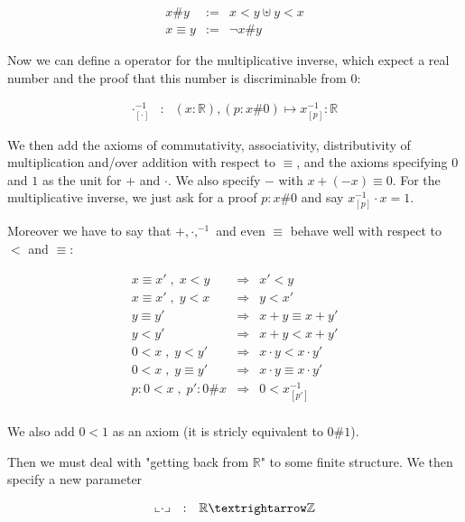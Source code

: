 \documentclass[a4paper,10pt]{article}
\newcommand{\R}{\mathbb{R}}
\newcommand{\Z}{\mathbb{Z}}
\begin{document}
  \[
  \begin{array}{ccl}
  x \# y     & := & x < y \uplus y < x \\
  x \equiv y & := & ¬ x \# y 
  \end{array}
  \]
  
  Now we can define a operator for the multiplicative inverse, which expect a real number and the proof that this number is discriminable from 0:
  
  \[
  \begin{array}{ccl}
  \cdot^{-1}_{[\cdot]} & : & (x:\R), (p:x\#0) \mapsto x^{-1}_{[p]} : \R
  \end{array}
  \]
  
  We then add the axioms of commutativity, associativity, distributivity of multiplication and/over addition with respect to $\equiv$, and the axioms specifying $0$ and $1$ as the unit for $+$ and $\cdot$. We also specify $-$ with $x+(-x)\equiv 0$. For the multiplicative inverse, we just ask for a proof $p:x\#0$ and say $x^{-1}_{[p]}\cdot x=1$.
  
  Moreover we have to say that $+,\cdot,^{-1}$ and even $\equiv$ behave well with respect to $<$ and $\equiv$:
  
  \[
  \begin{array}{rcl}
  x \equiv x' \;,\; x < y   &  \Rightarrow  & x' < y \\
  x \equiv x' \;,\; y < x   &  \Rightarrow  & y < x' \\
  y \equiv y'               &  \Rightarrow  & x + y \equiv x + y' \\
  y < y'                    &  \Rightarrow  & x + y < x + y' \\
  0 < x \;,\; y < y'        &  \Rightarrow  & x \cdot y < x \cdot y' \\
  0 < x \;,\; y \equiv y'   &  \Rightarrow  & x \cdot y \equiv x \cdot y' \\
  p:0<x \;,\;  p':0\#x      &  \Rightarrow  & 0 < x^{-1}_{[p']} \\
  \end{array}
  \]
  
  We also add $0<1$ as an axiom (it is stricly equivalent to $0\#1$). %
  
  Then we must deal with "getting back from $\R$" to some finite structure. We then specify a new parameter 
  
  \[
  \begin{array}{rcl}
  \llcorner \cdot \lrcorner &    :          & \R → \Z \\
  \end{array}\\
  \]
  
\end{document}
